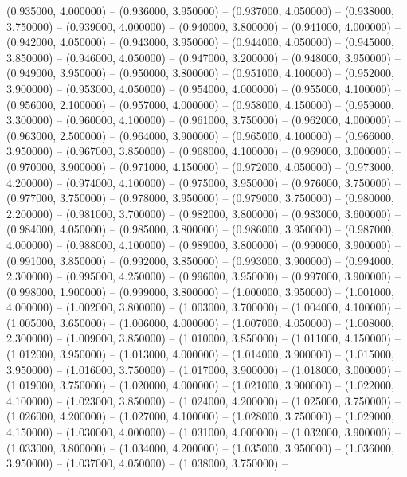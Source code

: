 (0.935000, 4.000000) -- 
(0.936000, 3.950000) -- 
(0.937000, 4.050000) -- 
(0.938000, 3.750000) -- 
(0.939000, 4.000000) -- 
(0.940000, 3.800000) -- 
(0.941000, 4.000000) -- 
(0.942000, 4.050000) -- 
(0.943000, 3.950000) -- 
(0.944000, 4.050000) -- 
(0.945000, 3.850000) -- 
(0.946000, 4.050000) -- 
(0.947000, 3.200000) -- 
(0.948000, 3.950000) -- 
(0.949000, 3.950000) -- 
(0.950000, 3.800000) -- 
(0.951000, 4.100000) -- 
(0.952000, 3.900000) -- 
(0.953000, 4.050000) -- 
(0.954000, 4.000000) -- 
(0.955000, 4.100000) -- 
(0.956000, 2.100000) -- 
(0.957000, 4.000000) -- 
(0.958000, 4.150000) -- 
(0.959000, 3.300000) -- 
(0.960000, 4.100000) -- 
(0.961000, 3.750000) -- 
(0.962000, 4.000000) -- 
(0.963000, 2.500000) -- 
(0.964000, 3.900000) -- 
(0.965000, 4.100000) -- 
(0.966000, 3.950000) -- 
(0.967000, 3.850000) -- 
(0.968000, 4.100000) -- 
(0.969000, 3.000000) -- 
(0.970000, 3.900000) -- 
(0.971000, 4.150000) -- 
(0.972000, 4.050000) -- 
(0.973000, 4.200000) -- 
(0.974000, 4.100000) -- 
(0.975000, 3.950000) -- 
(0.976000, 3.750000) -- 
(0.977000, 3.750000) -- 
(0.978000, 3.950000) -- 
(0.979000, 3.750000) -- 
(0.980000, 2.200000) -- 
(0.981000, 3.700000) -- 
(0.982000, 3.800000) -- 
(0.983000, 3.600000) -- 
(0.984000, 4.050000) -- 
(0.985000, 3.800000) -- 
(0.986000, 3.950000) -- 
(0.987000, 4.000000) -- 
(0.988000, 4.100000) -- 
(0.989000, 3.800000) -- 
(0.990000, 3.900000) -- 
(0.991000, 3.850000) -- 
(0.992000, 3.850000) -- 
(0.993000, 3.900000) -- 
(0.994000, 2.300000) -- 
(0.995000, 4.250000) -- 
(0.996000, 3.950000) -- 
(0.997000, 3.900000) -- 
(0.998000, 1.900000) -- 
(0.999000, 3.800000) -- 
(1.000000, 3.950000) -- 
(1.001000, 4.000000) -- 
(1.002000, 3.800000) -- 
(1.003000, 3.700000) -- 
(1.004000, 4.100000) -- 
(1.005000, 3.650000) -- 
(1.006000, 4.000000) -- 
(1.007000, 4.050000) -- 
(1.008000, 2.300000) -- 
(1.009000, 3.850000) -- 
(1.010000, 3.850000) -- 
(1.011000, 4.150000) -- 
(1.012000, 3.950000) -- 
(1.013000, 4.000000) -- 
(1.014000, 3.900000) -- 
(1.015000, 3.950000) -- 
(1.016000, 3.750000) -- 
(1.017000, 3.900000) -- 
(1.018000, 3.000000) -- 
(1.019000, 3.750000) -- 
(1.020000, 4.000000) -- 
(1.021000, 3.900000) -- 
(1.022000, 4.100000) -- 
(1.023000, 3.850000) -- 
(1.024000, 4.200000) -- 
(1.025000, 3.750000) -- 
(1.026000, 4.200000) -- 
(1.027000, 4.100000) -- 
(1.028000, 3.750000) -- 
(1.029000, 4.150000) -- 
(1.030000, 4.000000) -- 
(1.031000, 4.000000) -- 
(1.032000, 3.900000) -- 
(1.033000, 3.800000) -- 
(1.034000, 4.200000) -- 
(1.035000, 3.950000) -- 
(1.036000, 3.950000) -- 
(1.037000, 4.050000) -- 
(1.038000, 3.750000) -- 

